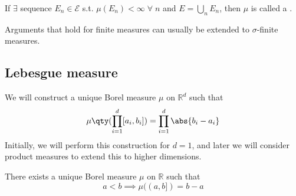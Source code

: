 \begin{definition}
	If $\exists$ sequence $E_n \in \mathcal{E}$ s.t. $\mu(E_n) < \infty \; \forall \; n$ and $E = \bigcup_n E_n$, then $\mu$ is called a .
\end{definition}

\begin{remark}
	Arguments that hold for finite measures can usually be extended to $\sigma$-finite measures.
\end{remark}

\subsection{Lebesgue measure}
We will construct a unique Borel measure $\mu$ on $\mathbb R^d$ such that
\[ \mu\qty(\prod_{i=1}^d [a_i, b_i]) = \prod_{i=1}^d \abs{b_i - a_i} \]
Initially, we will perform this construction for $d = 1$, and later we will consider product measures to extend this to higher dimensions.

\begin{theorem}
	There exists a unique Borel measure $\mu$ on $\mathbb R$ such that
	\[ a < b \implies \mu((a,b]) = b - a \]
\end{theorem}

